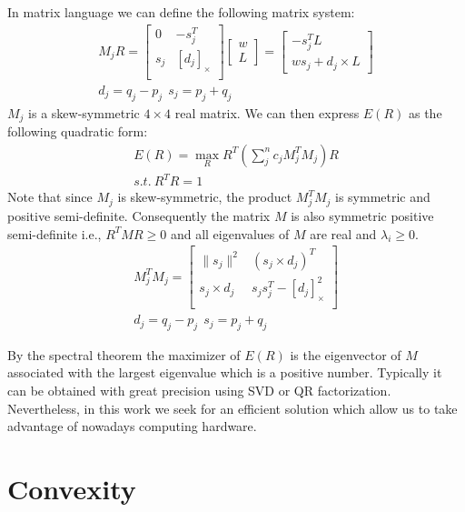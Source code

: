 \documentclass{birkjour}
\numberwithin{equation}{section}
\begin{document}
In matrix language we can define the following matrix system:
\begin{eqnarray*}
	M_j R =
	\left[\begin{array}{cc}
		0      &       -s_j^T \\
		s_j    &   \left[ d_j \right]_\times \\
	\end{array}\right]
	\left[\begin{array}{c} 
		w \\
		L
	\end{array}\right] = 
	\left[\begin{array}{c}
		-s_j^T L \\
		w s_j + d_j \times L 
	\end{array}\right]\\
	d_j = q_j - p_j \ \ s_j = p_j + q_j
\end{eqnarray*}
$M_j$ is a skew-symmetric $4\times 4$ real matrix. We can then express $E(R)$ as the following quadratic form:
\begin{eqnarray*}
	E(R) = \max_R R^T (\sum_j^n { c_j M_j^T M_j}) R\\
	s.t. \ R^T R = 1
\end{eqnarray*}
Note that since $M_j$ is skew-symmetric, the product $M_j^T M_j$ is symmetric and positive semi-definite. 
Consequently the matrix $M$ is also symmetric positive semi-definite i.e., $R^T M R \geq 0$ and all eigenvalues of $M$ are real and $\lambda_i \geq 0$.
\begin{eqnarray*}
	M_j^T M_j = 
	\left[\begin{array}{cc}
		 \| s_j \|^2       &         (s_j \times d_j)^T \\
		s_j \times d_j  &    s_j s_j^T - \left[ d_j \right]^2_\times \\
	\end{array}\right]\\
	d_j = q_j - p_j \ \ s_j = p_j + q_j
\end{eqnarray*}

By the spectral theorem the maximizer of $E(R)$ is the eigenvector of $M$ associated with the largest eigenvalue which is a positive number.
Typically it can be obtained with great precision using SVD or QR factorization.
Nevertheless, in this work we seek for an efficient solution which allow us to take advantage of nowadays computing hardware.

\section{Convexity}
\end{document}
